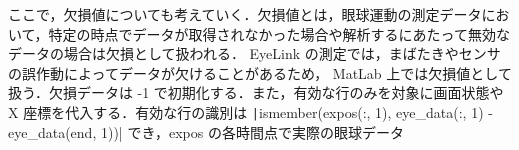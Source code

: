 \documentclass[dvipdfmx, titlepage, t]{jsarticle}
\begin{document}
    ここで，欠損値についても考えていく．欠損値とは，眼球運動の測定データにおいて，特定の時点でデータが取得されなかった場合や解析するにあたって無効なデータの場合は欠損として扱われる． EyeLink の測定では，まばたきやセンサの誤作動によってデータが欠けることがあるため， MatLab 上では欠損値として扱う．欠損データは -1 で初期化する．また，有効な行のみを対象に画面状態や X 座標を代入する．有効な行の識別は \texttt|ismember(expos(:, 1), eye_data(:, 1) - eye_data(end, 1))| でき，expos の各時間点で実際の眼球データ
\end{document}
